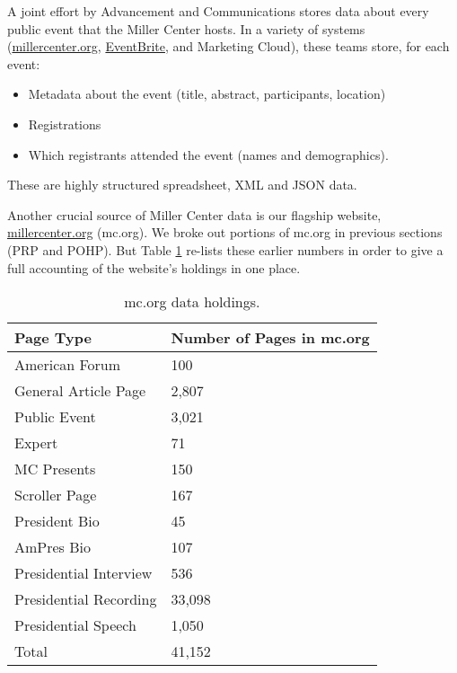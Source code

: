 \documentclass[12pt, oneside]{article}   	%
\begin{document}
A joint effort by Advancement and Communications stores data about every public event that the Miller Center hosts.  In a variety of systems (\href{https://millercenter.org}{millercenter.org}, \href{eventbrite.com}{EventBrite}, and Marketing Cloud), these teams store, for each event:
\begin{itemize}
\item Metadata about the event (title, abstract, participants, location)
\item Registrations
\item Which registrants attended the event (names and demographics).
\end{itemize}
These  are highly structured spreadsheet, XML and JSON data.  

Another crucial source of Miller Center data is our flagship website, \href{https://millercenter.org}{millercenter.org} (mc.org).  We broke out portions of mc.org in previous sections (PRP and POHP).  But Table \ref{table.data.mcorg} re-lists these earlier numbers in order to give a full accounting of the website's holdings in one place.


\begin{table}[htp]
\caption{mc.org data holdings.}
\begin{center}
\begin{tabular}{ p{1.75in} p{2in}}
\toprule
Page Type				&	Number of Pages in mc.org		\\
\midrule
American Forum			&	100		\\
\midrule
General Article Page			&	2,807	\\
\midrule
Public Event				&	3,021	\\
\midrule
Expert					&	71		\\
\midrule
MC Presents				&	150		\\
\midrule
Scroller Page				&	167		\\
\midrule
President Bio				&	45		\\
\midrule
AmPres Bio				&	107		\\
\midrule
Presidential Interview		&	536		\\
\midrule
Presidential Recording		&	33,098	\\
\midrule
Presidential Speech			&	1,050	\\
\bottomrule		
Total						& 	41,152	\\
\bottomrule
\end{tabular}
\end{center}
\label{table.data.mcorg}
\end{table}%
\end{document}
